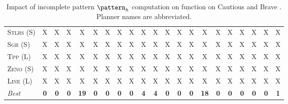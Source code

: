 \begin{table}[tb]
{\begin{tabular}{|l||cccccccccc||cccccccccc||}
\textsc{Stlrs} (S)&X&X&X&X&X&X&X&X&X&X&X&X&X&X&X&X&X&X&X&X\\
\textsc{Sgr} (S)&X&X&X&X&X&X&X&X&X&X&X&X&X&X&X&X&X&X&X&X\\
\textsc{Tpp} (L)&X&X&X&X&X&X&X&X&X&X&X&X&X&X&X&X&X&X&X&X\\
\textsc{Zeno} (S)&X&X&X&X&X&X&X&X&X&X&X&X&X&X&X&X&X&X&X&X\\
\textsc{Line} (L)&X&X&X&X&X&X&X&X&X&X&X&X&X&X&X&X&X&X&X&X
\\\hline
\textit{Best}&\textbf{0}&\textbf{0}&\textbf{0}&\textbf{19}&\textbf{0}&\textbf{0}&\textbf{0}&\textbf{0}&\textbf{4}&\textbf{4}&\textbf{0}&\textbf{0}&\textbf{0}&\textbf{18}&\textbf{0}&\textbf{0}&\textbf{0}&\textbf{0}&\textbf{0}&\textbf{1}\\\hline

        \end{tabular}}
        \caption{Impact of incomplete pattern $\pattern_h$ computation on function on Cautious and Brave \pattyd. Planner names are abbreviated.}
        \label{tab:abl-patternh-incomplete}
        \end{table}
        